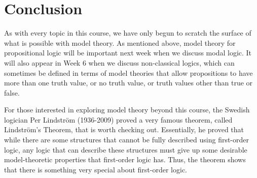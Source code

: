 \documentclass[11pt]{article}
\theoremstyle{definition}
\theoremstyle{remark}
\begin{document}
\section{Conclusion}
As with every topic in this course, we have only begun to scratch the surface of what is possible with model theory. As mentioned above, model theory for propositional logic will be important next week when we discuss modal logic. It will also appear in Week 6 when we discuss non-classical logics, which can sometimes be defined in terms of model theories that allow propositions to have more than one truth value, or no truth value, or truth values other than true or false.\par 

For those interested in exploring model theory beyond this course, the Swedish logician Per Lindstr\"om (1936-2009) proved a very famous theorem, called Lindstr\"om's Theorem, that is worth checking out. Essentially, he proved that while there are some structures that cannot be fully described using first-order logic, any logic that can describe these structures must give up some desirable model-theoretic properties that first-order logic has. Thus, the theorem shows that there is something very special about first-order logic.
\end{document}
